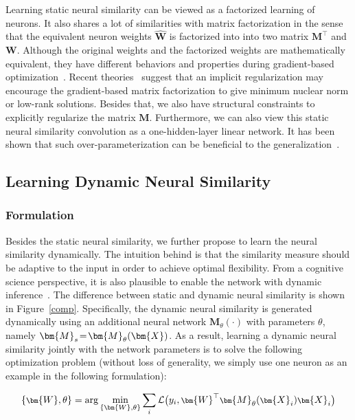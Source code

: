 Learning static neural similarity can be viewed as a factorized learning of neurons. It also shares a lot of similarities with matrix factorization in the sense that the equivalent neuron weights $\hat{\bm{W}}$ is factorized into into two matrix $\bm{M}^\top$ and $\bm{W}$. Although the original weights and the factorized weights are mathematically equivalent, they have different behaviors and properties during gradient-based optimization~\cite{gunasekar2017implicit}. Recent theories~\cite{gunasekar2017implicit,arora2019implicit,li2018algorithmic} suggest that an implicit regularization may encourage the gradient-based matrix factorization to give minimum nuclear norm or low-rank solutions. Besides that, we also have structural constraints to explicitly regularize the matrix $\bm{M}$. Furthermore, we can also view this static neural similarity convolution as a one-hidden-layer linear network. It has been shown that such over-parameterization can be beneficial to the generalization~\cite{kawaguchi2016deep,arora2018convergence,neyshabur2018towards,arora2018optimization}.

\subsection{Learning Dynamic Neural Similarity}

\subsubsection{Formulation}

Besides the static neural similarity, we further propose to learn the neural similarity dynamically. The intuition behind is that the similarity measure should be adaptive to the input in order to achieve optimal flexibility. From a cognitive science perspective, it is also plausible to enable the network with dynamic inference~\cite{wang2007cognitive,leven1996multiattribute}. The difference between static and dynamic neural similarity is shown in Figure~\ref{comp}. Specifically, the dynamic neural similarity is generated dynamically using an additional neural network $\bm{M}_{\theta}(\cdot)$ with parameters $\theta$, namely $\thickmuskip=2mu \medmuskip=2mu \bm{M}_s=\bm{M}_\theta(\bm{X})$. As a result, learning a dynamic neural similarity jointly with the network parameters is to solve the following optimization problem (without loss of generality, we simply use one neuron as an example in the following formulation):

\begin{equation}
\footnotesize
    \{\bm{W},\theta\} =\arg\min_{\{\bm{W},\theta\}} \sum_i\mathcal{L}\big(y_i,\bm{W}^\top \bm{M}_\theta(\bm{X}_i)\bm{X}_i\big)
\end{equation}

